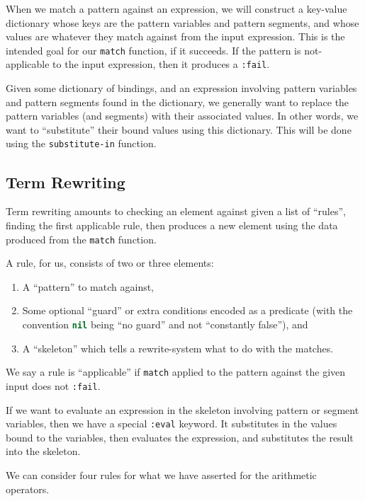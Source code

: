 When we match a pattern against an expression, we will construct a
key-value dictionary whose keys are the pattern variables and pattern
segments, and whose values are whatever they match against from the
input expression. This is the intended goal for our
\lstinline[language=lisp]{match} function, if it succeeds. If the
pattern is not-applicable to the input expression, then it produces a
\lstinline[language=lisp]{:fail}.

Given some dictionary of bindings, and an expression involving pattern
variables and pattern segments found in the dictionary, we generally
want to replace the pattern variables (and segments) with their
associated values. In other words, we want to ``substitute'' their bound
values using this dictionary.
This will be done using the
\lstinline[language=lisp]{substitute-in} function.

\subsection{Term Rewriting}
Term rewriting amounts to checking an element against given a list of ``rules'',
finding the first applicable rule, then produces a new element using the
data produced from the \lstinline[language=lisp]{match} function.

A rule, for us, consists of two or three elements:
\begin{enumerate}
\item A ``pattern'' to match against,
\item Some optional ``guard'' or extra conditions encoded as a predicate
  (with the convention \lstinline[language=lisp]{nil} being ``no guard''
  and not ``constantly false''), and
\item A ``skeleton'' which tells a rewrite-system what to do with the matches.
\end{enumerate}
We say a rule is ``applicable'' if \lstinline[language=lisp]{match}
applied to the pattern against the given input does not
\lstinline[language=lisp]{:fail}.

If we want to evaluate an expression in the skeleton involving pattern
or segment variables, then we have a special \lstinline[language=lisp]{:eval}
keyword. It substitutes in the values bound to the variables, then
evaluates the expression, and substitutes the result into the skeleton.

We can consider four rules for what we have asserted for the arithmetic operators.

